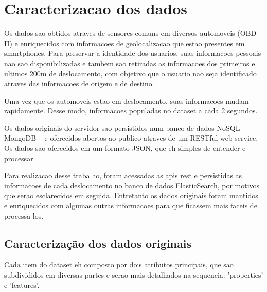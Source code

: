 \documentclass[10pt, conference]{IEEEtran}
\begin{document}
\section{Caracterizacao dos dados}
%

Os dados sao obtidos atraves de sensores comuns em diversos
automoveis (OBD-II) e enriquecidos com informacoes de geolocalizacao
que estao presentes em smartphones. Para preservar a identidade
dos usuarios, suas informacoes pessoais nao sao disponibilizadas e tambem
sao retiradas as informacoes dos primeiros e ultimos 200m de deslocamento,
com objetivo que o usuario nao seja identificado atraves das informacoes
de origem e de destino. 

Uma vez que os automoveis estao em deslocamento, suas informacoes mudam
rapidamente. Desse modo, informacoes populadas no dataset a cada 2 segundos.

Os dados originais do servidor sao persistidos num banco de dados NoSQL -- 
MongoDB -- e oferecidos abertos ao publico atraves de um RESTful web service.
Os dados sao oferecidos em um formato JSON, que eh simples de entender e processar.

Para realizacao desse trabalho, foram acessadas as apis rest e persistidas
as informacoes de cada deslocamento no banco de dados ElasticSearch, por 
motivos que serao esclarecidos em seguida. Entretanto os dados originais foram
mantidos e enriquecidos com algumas outras informacoes para que ficassem 
mais faceis de processa-los.



\subsection{Caracterização dos dados originais}

Cada item do dataset eh composto por dois atributos principais, que sao subdivididos
em diversas partes e serao mais detalhados na sequencia: 'properties' e 'features'. 
\end{document}
